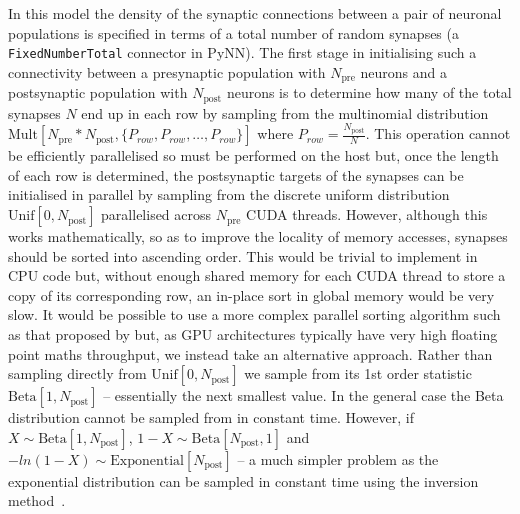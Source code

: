 \documentclass[utf8]{frontiersSCNS} %
\begin{document}
In this model the density of the synaptic connections between a pair of neuronal populations is specified in terms of a total number of random synapses (a \lstinline{FixedNumberTotal} connector in PyNN).
The first stage in initialising such a connectivity between a presynaptic population with $N_{\text{pre}}$ neurons and a postsynaptic population with $N_{\text{post}}$ neurons is to determine how many of the total synapses $N$ end up in each row by sampling from the multinomial distribution $\text{Mult}[N_{\text{pre}} * N_{\text{post}}, \{P_{row}, P_{row}, \ldots, P_{row}\}]$ where $P_{row} = \frac{N_{\text{post}}}{N}$.
This operation cannot be efficiently parallelised so must be performed on the host but, once the length of each row is determined, the postsynaptic targets of the synapses can be initialised in parallel by sampling from the discrete uniform distribution $\text{Unif}[0, N_{\text{post}}]$ parallelised across $N_{\text{pre}}$ CUDA threads.
However, although this works mathematically, so as to improve the locality of memory accesses, synapses should be sorted into ascending order.
This would be trivial to implement in CPU code but, without enough shared memory for each CUDA thread to store a copy of its corresponding row, an in-place sort in global memory would be very slow.
It would be possible to use a more complex parallel sorting algorithm such as that proposed by \citet{Awan2016} but, as GPU architectures typically have very high floating point maths throughput, we instead take an alternative approach.
Rather than sampling directly from $\text{Unif}[0, N_{\text{post}}]$ we sample from its 1st order statistic $\text{Beta}[1, N_{\text{post}}]$ -- essentially the next smallest value.
In the general case the Beta distribution cannot be sampled from in constant time.
However, if $X \sim \text{Beta}[1, N_{\text{post}}]$, $1 - X \sim \text{Beta}[N_{\text{post}}, 1]$ and $-ln(1 - X) \sim \text{Exponential}[N_{\text{post}}]$ -- a much simpler problem as the exponential distribution can be sampled in constant time using the inversion method~\citep{DevroyeLuc2013}.
\end{document}

